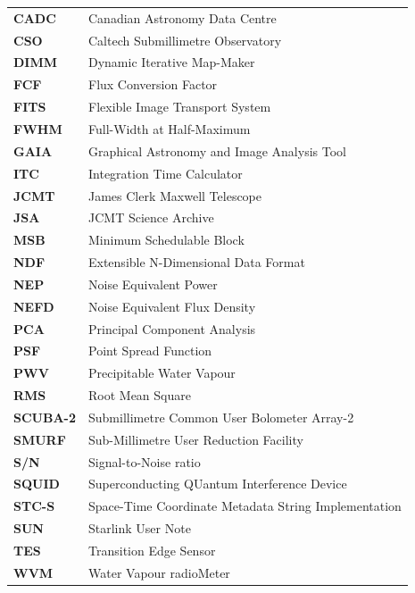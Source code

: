 \documentclass[11pt,oneside,chapters]{starlink}
\begin{document}
\begin{table}[h!]
\begin{tabular}{ll}
\textbf{CADC}   & Canadian Astronomy Data Centre\\
\textbf{CSO}    & Caltech Submillimetre Observatory\\
\textbf{DIMM}   & Dynamic Iterative Map-Maker\\
\textbf{FCF}    & Flux Conversion Factor\\
\textbf{FITS}   & Flexible Image Transport System\\
\textbf{FWHM}   & Full-Width at Half-Maximum\\
\textbf{GAIA}   & Graphical Astronomy and Image Analysis Tool\\
\textbf{ITC}    & Integration Time Calculator\\
\textbf{JCMT}   & James Clerk Maxwell Telescope\\
\textbf{JSA}    & JCMT Science Archive\\
\textbf{MSB}    & Minimum Schedulable Block\\
\textbf{NDF}    & Extensible N-Dimensional Data Format\\
\textbf{NEP}    & Noise Equivalent Power\\
\textbf{NEFD}   & Noise Equivalent Flux Density\\
\textbf{PCA}    & Principal Component Analysis\\
\textbf{PSF}    & Point Spread Function\\
\textbf{PWV}    & Precipitable Water Vapour\\
\textbf{RMS}    & Root Mean Square\\
\textbf{SCUBA-2}& Submillimetre Common User Bolometer Array-2\\
\textbf{SMURF}  & Sub-Millimetre User Reduction Facility\\
\textbf{S/N}    & Signal-to-Noise ratio\\
\textbf{SQUID}  & Superconducting QUantum Interference Device\\
\textbf{STC-S}  & Space-Time Coordinate Metadata String Implementation\\
\textbf{SUN}    & Starlink User Note\\
\textbf{TES}    & Transition Edge Sensor\\
\textbf{WVM}    & Water Vapour radioMeter\\
\end{tabular}
\end{table}
\end{document}

